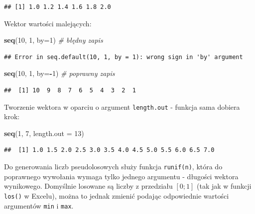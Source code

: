 \documentclass[]{book}
\newenvironment{Shaded}{\begin{snugshade}}{\end{snugshade}}
\newcommand{\KeywordTok}[1]{\textcolor[rgb]{0.13,0.29,0.53}{\textbf{#1}}}
\newcommand{\DataTypeTok}[1]{\textcolor[rgb]{0.13,0.29,0.53}{#1}}
\newcommand{\DecValTok}[1]{\textcolor[rgb]{0.00,0.00,0.81}{#1}}
\newcommand{\CommentTok}[1]{\textcolor[rgb]{0.56,0.35,0.01}{\textit{#1}}}
\newcommand{\OperatorTok}[1]{\textcolor[rgb]{0.81,0.36,0.00}{\textbf{#1}}}
\newcommand{\NormalTok}[1]{#1}
\begin{document}
\begin{verbatim}
## [1] 1.0 1.2 1.4 1.6 1.8 2.0
\end{verbatim}

Wektor wartości malejących:

\begin{Shaded}
\begin{Highlighting}[]
\KeywordTok{seq}\NormalTok{(}\DecValTok{10}\NormalTok{, }\DecValTok{1}\NormalTok{, }\DataTypeTok{by=}\DecValTok{1}\NormalTok{) }\CommentTok{# błędny zapis}
\end{Highlighting}
\end{Shaded}

\begin{verbatim}
## Error in seq.default(10, 1, by = 1): wrong sign in 'by' argument
\end{verbatim}

\begin{Shaded}
\begin{Highlighting}[]
\KeywordTok{seq}\NormalTok{(}\DecValTok{10}\NormalTok{, }\DecValTok{1}\NormalTok{, }\DataTypeTok{by=}\OperatorTok{-}\DecValTok{1}\NormalTok{) }\CommentTok{# poprawny zapis}
\end{Highlighting}
\end{Shaded}

\begin{verbatim}
##  [1] 10  9  8  7  6  5  4  3  2  1
\end{verbatim}

Tworzenie wektora w oparciu o argument \texttt{length.out} - funkcja
sama dobiera krok:

\begin{Shaded}
\begin{Highlighting}[]
\KeywordTok{seq}\NormalTok{(}\DecValTok{1}\NormalTok{, }\DecValTok{7}\NormalTok{, }\DataTypeTok{length.out =} \DecValTok{13}\NormalTok{)}
\end{Highlighting}
\end{Shaded}

\begin{verbatim}
##  [1] 1.0 1.5 2.0 2.5 3.0 3.5 4.0 4.5 5.0 5.5 6.0 6.5 7.0
\end{verbatim}

Do generowania liczb pseudolosowych służy funkcja \texttt{runif(n)},
która do poprawnego wywołania wymaga tylko jednego argumentu - długości
wektora wynikowego. Domyślnie losowane są liczby z przedziału \([0;1]\)
(tak jak w funkcji \texttt{los()} w Excelu), można to jednak zmienić
podając odpowiednie wartości argumentów \texttt{min} i \texttt{max}.
\end{document}
